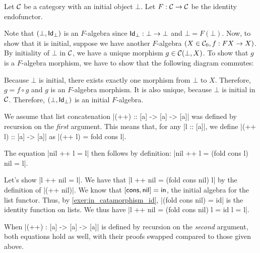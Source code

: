\begin{solution}\label{sol:initialalg_for_idfun_with_initialob}
	Let $\CC$ be a category with an initial object $\bot$. Let $ F: \CC \to \CC $ be the identity endofunctor.

	Note that $ (\bot, \Id[\bot]) $ is an $ F $-algebra since $ \Id[\bot]: \bot \to \bot $ and $ \bot = F(\bot) $. Now, to show that it is initial, suppose we have another $ F $-algebra $ (X \in \Ob \CC, f: F X \to X) $. By initiality of $ \bot $ in $ \CC $, we have a unique morphism $ g \in \CC(\bot, X) $. To show that $ g $ is a $ F $-algebra morphism, we have to show that the following diagram commutes:
	\begin{center}
	\end{center}
	Because $ \bot $ is initial, there exists exactly one morphism from $ \bot $ to $ X $. Therefore, $ g = f \circ g $ and $ g $ is an $ F $-algebra morphism. It is also unique, because $ \bot $ is initial in $ \CC $. Therefore, $ (\bot, \Id[\bot]) $ is an initial $ F $-algebra.
\end{solution}


\begin{solution}\label{sol:list-concat-nil}
  We assume that list concatenation |(++) :: [a] -> [a] -> [a]| was defined by recursion on the \emph{first} argument.
  This means that, for any |l :: [a]|, we define |(++ l) :: [a] -> [a]| as |(++ l) = fold cons l|.

  The equation |nil ++ l = l| then follows by definition: |nil ++ l = (fold cons l) nil = l|.

  Let's show |l ++ nil = l|.
  We have that |l ++ nil = (fold cons nil) l| by the definition of |(++ nil)|.
  We know that $[\cons,\nil] = \In$, the initial algebra for the list functor.
  Thus, by \cref{exer:in_catamorphism_id}, |(fold cons nil) = id| is the identity function on lists.
  We thus have |l ++ nil = (fold cons nil) l = id l = l|.

  When |(++) : [a] -> [a] -> [a]| is defined by recursion on the \emph{second} argument, both equations hold as well, with their proofs swapped compared to those given above.
\end{solution}


